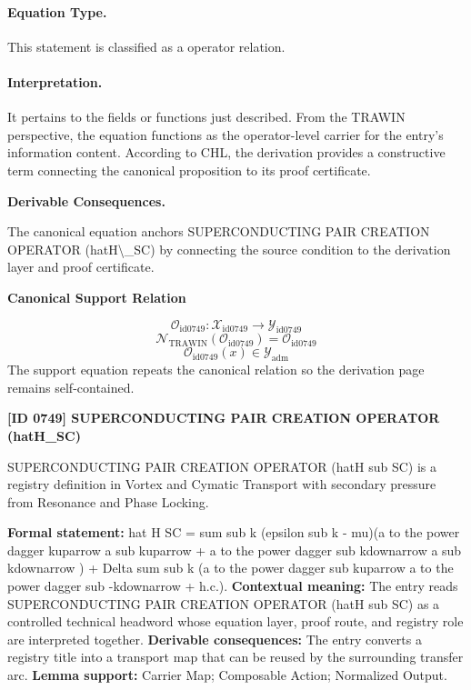 \paragraph{Equation Type.}
This statement is classified as a operator relation.

\paragraph{Interpretation.}
It pertains to the fields or functions just described. From the TRAWIN perspective, the equation functions as the operator-level carrier for the entry’s information content. According to CHL, the derivation provides a constructive term connecting the canonical proposition to its proof certificate.

\par\vspace{0.35em}
\noindent\textbf{Derivable Consequences.}\quad
\begingroup
\footnotesize
\raggedright
The canonical equation anchors SUPERCONDUCTING PAIR CREATION OPERATOR (hatH\textbackslash{}\_SC) by connecting the source condition to the derivation layer and proof certificate.
\par\endgroup

\noindent\textbf{Canonical Support Relation}\par
\[
\mathcal{O}_{\mathrm{id0749}}:\mathcal{X}_{\mathrm{id0749}}\longrightarrow\mathcal{Y}_{\mathrm{id0749}}
\]
\[
\mathcal{N}_{\mathrm{TRAWIN}}(\mathcal{O}_{\mathrm{id0749}})=\mathcal{O}_{\mathrm{id0749}}
\]
\[
\mathcal{O}_{\mathrm{id0749}}(x)\in\mathcal{Y}_{\mathrm{adm}}
\]
\noindent The support equation repeats the canonical relation so the derivation page remains self-contained.\par

\clearpage
\noindent\textbf{[ID 0749] SUPERCONDUCTING PAIR CREATION OPERATOR (hatH\_SC)}\par
\vspace{0.35em}
\begingroup\small
{}
SUPERCONDUCTING PAIR CREATION OPERATOR (hatH sub SC) is a registry definition in Vortex and Cymatic Transport with secondary pressure from Resonance and Phase Locking.

\begingroup\footnotesize\setlength{\emergencystretch}{3em}\sloppy
\textbf{Formal statement:} hat H SC = sum sub k (epsilon sub k - mu)(a to the power dagger kuparrow a sub kuparrow + a to the power dagger sub kdownarrow a sub kdownarrow ) + Delta sum sub k (a to the power dagger sub kuparrow a to the power dagger sub -kdownarrow + h.c.). \textbf{Contextual meaning:} The entry reads SUPERCONDUCTING PAIR CREATION OPERATOR (hatH sub SC) as a controlled technical headword whose equation layer, proof route, and registry role are interpreted together. \textbf{Derivable consequences:} The entry converts a registry title into a transport map that can be reused by the surrounding transfer arc. \textbf{Lemma support:} Carrier Map; Composable Action; Normalized Output.\par
\endgroup

